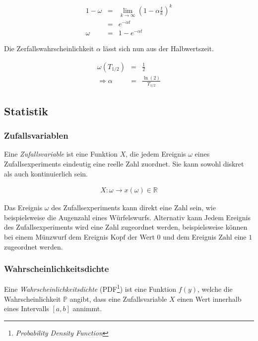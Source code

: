 \documentclass[12pt,a4paper]{scrartcl}
\numberwithin{equation}{section} %
\renewcommand{\[}{} %
\renewcommand{\]}{\noindent} %
\begin{document}
\begin{eqnarray}
	1 - \omega &=& \lim_{k \rightarrow \infty} \left(1 - \alpha \frac{t}{k} \right)^k \\
		&=& e^{- \alpha t} \\
	\omega &=& 1 - e^{-\alpha t}
\end{eqnarray}

\noindent
Die Zerfallswahrscheinlichkeit $\alpha$ lässt sich nun aus der Halbwertszeit.

\begin{eqnarray}
	\omega(T_{1/2}) &=& \frac{1}{2} \\
	\Rightarrow\alpha &=& \frac{\ln{(2)}}{T_{1/2}}
\end{eqnarray}

\hypertarget{statistik}{\subsection{Statistik}\label{statistik}}

\subsubsection{Zufallsvariablen}
\label{Zufallsvariablen}
Eine \emph{Zufallsvariable} ist eine Funktion $X$, die jedem Ereignis $\omega$ eines Zufallsexperiments eindeutig eine reelle Zahl zuordnet. Sie kann sowohl diskret als auch kontinuierlich sein.

\begin{eqnarray}
	X : \omega \rightarrow x(\omega) \in \mathbb{R}
\end{eqnarray}

\noindent
Das Ereignis $\omega$ des Zufallsexperiments kann direkt eine Zahl sein, wie beispielsweise die Augenzahl eines Würfelswurfs. Alternativ kann Jedem Ereignis des Zufallsexperiments wird eine Zahl zugeordnet werden, beispielsweise können bei einem Münzwurf dem Ereignis $\mathrm{Kopf}$ der Wert $0$ und dem Ereignis $\mathrm{Zahl}$ eine $1$ zugeordnet werden.

\subsubsection{Wahrscheinlichkeitsdichte}
\label{Wahrscheinlichkeitsdichte}
Eine \textit{Wahrscheinlichkeitsdichte} (PDF\footnote{\emph{Probability Density Function}}) ist eine Funktion $f(y)$, welche die Wahrscheinlichkeit $\mathbb P$ angibt, dass eine Zufallsvariable $X$ einen Wert innerhalb eines Intervalls $[a,b]$ annimmt.
\end{document}
